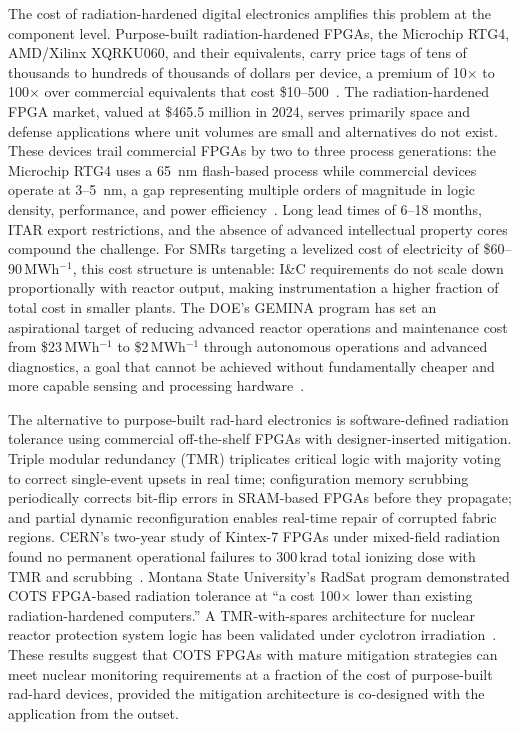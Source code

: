 The cost of radiation-hardened digital electronics amplifies this problem
at the component level. Purpose-built radiation-hardened FPGAs, the
Microchip RTG4, AMD/Xilinx XQRKU060, and their equivalents, carry price
tags of tens of thousands to hundreds of thousands of dollars per device,
a premium of 10$\times$ to 100$\times$ over commercial equivalents that
cost \$10--500~\cite{BISResearch_RadHardFPGA}. The radiation-hardened
FPGA market, valued at \$465.5 million in 2024, serves primarily space
and defense applications where unit volumes are small and alternatives
do not exist. These devices trail commercial FPGAs by two to three process
generations: the Microchip RTG4 uses a 65~nm flash-based process while
commercial devices operate at 3--5~nm, a gap representing multiple orders
of magnitude in logic density, performance, and power
efficiency~\cite{Microchip_RTG4, AMD_XQRKU060}. Long lead times of 6--18
months, ITAR export restrictions, and the absence of advanced intellectual
property cores compound the challenge. For SMRs targeting a levelized cost
of electricity of \$60--90\,MWh$^{-1}$, this cost structure is untenable:
I\&C requirements do not scale down proportionally with reactor output,
making instrumentation a higher fraction of total cost in smaller plants.
The DOE's GEMINA program has set an aspirational target of reducing
advanced reactor operations and maintenance cost from \$23\,MWh$^{-1}$
to \$2\,MWh$^{-1}$ through autonomous operations and advanced diagnostics,
a goal that cannot be achieved without fundamentally cheaper and more
capable sensing and processing hardware~\cite{DOE_GEMINA}.

The alternative to purpose-built rad-hard electronics is software-defined
radiation tolerance using commercial off-the-shelf FPGAs with designer-inserted
mitigation. Triple modular redundancy (TMR) triplicates critical logic with
majority voting to correct single-event upsets in real time; configuration
memory scrubbing periodically corrects bit-flip errors in SRAM-based
FPGAs before they propagate; and partial dynamic reconfiguration enables
real-time repair of corrupted fabric regions. CERN's two-year study of
Kintex-7 FPGAs under mixed-field radiation found no permanent operational
failures to 300\,krad total ionizing dose with TMR and
scrubbing~\cite{CERN_FPGA_Rad}. Montana State University's RadSat program
demonstrated COTS FPGA-based radiation tolerance at ``a cost 100$\times$
lower than existing radiation-hardened computers.'' A TMR-with-spares
architecture for nuclear reactor protection system logic has been
validated under cyclotron irradiation~\cite{SciDirect_TMR_Nuclear}. These
results suggest that COTS FPGAs with mature mitigation strategies can meet
nuclear monitoring requirements at a fraction of the cost of purpose-built
rad-hard devices, provided the mitigation architecture is co-designed with
the application from the outset.


